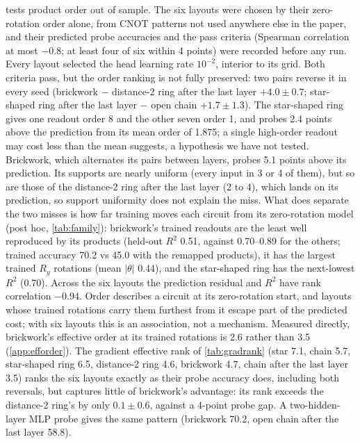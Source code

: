  tests product order out of sample. The six layouts were chosen by their
zero-rotation order alone, from CNOT patterns not used anywhere else in the paper, and their
predicted probe accuracies and the pass criteria (Spearman correlation at most $-0.8$; at least
four of six within 4 points) were recorded before any run. Every layout selected the head learning rate $10^{-2}$,
interior to its grid. Both criteria pass, but the order ranking is not fully preserved: two pairs
reverse it in every seed (brickwork $-$ distance-2 ring after the last layer $+4.0\pm0.7$;
star-shaped ring after the last layer $-$ open chain $+1.7\pm1.3$). The star-shaped ring gives one
readout order 8 and the other seven order 1, and probes 2.4 points above the prediction from
its mean order of 1.875; a single high-order readout may cost less than the mean suggests, a
hypothesis we have not tested. Brickwork, which alternates its pairs between layers, probes 5.1 points
above its prediction. Its supports are nearly uniform (every input in 3 or 4 of them), but so
are those of the distance-2 ring after the last layer (2 to 4), which lands on its prediction,
so support uniformity does not explain the miss. What does separate the two misses is how far
training moves each circuit from its zero-rotation model (post hoc, \cref{tab:family}):
brickwork's trained readouts are the least well reproduced by its products (held-out $R^2$
0.51, against 0.70--0.89 for the others; trained accuracy 70.2 vs 45.0 with the remapped
products), it has the largest trained $R_y$ rotations (mean $|\theta|$ 0.44), and the
star-shaped ring has the next-lowest $R^2$ (0.70). Across the six layouts the prediction
residual and $R^2$ have rank correlation $-0.94$. Order describes a circuit at its zero-rotation
start, and layouts whose trained rotations carry them furthest from it escape part of the
predicted cost; with six layouts this is an association, not a mechanism. Measured directly,
brickwork's effective order at its trained rotations is 2.6 rather than 3.5 (\cref{app:efforder}). The gradient
effective rank of \cref{tab:gradrank} (star 7.1, chain 5.7, star-shaped ring 6.5, distance-2
ring 4.6, brickwork 4.7, chain after the last layer 3.5) ranks the six layouts exactly as their
probe accuracy does, including both reversals, but captures little of brickwork's advantage:
its rank exceeds the distance-2 ring's by only $0.1\pm0.6$, against a 4-point probe gap. A two-hidden-layer MLP probe gives the same pattern (brickwork 70.2, open chain
after the last layer 58.8).

